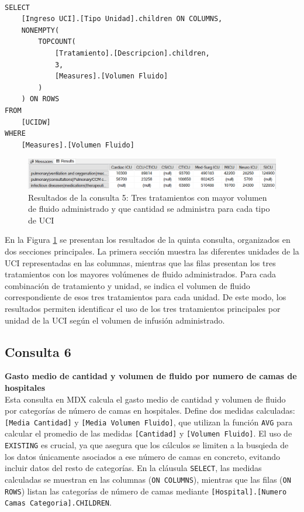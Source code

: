 \documentclass{article}
\begin{document}
\begin{lstlisting}[style=ddlstyle, label=lst:consulta5,caption=Consulta 5: Tres tratamientos con mayor volumen de fluido administrado y que cantidad se administra para cada tipo de UCI]
	
SELECT 
	[Ingreso UCI].[Tipo Unidad].children ON COLUMNS, 
	NONEMPTY(
		TOPCOUNT(
			[Tratamiento].[Descripcion].children, 
			3, 
			[Measures].[Volumen Fluido]
		)
	) ON ROWS
FROM 
	[UCIDW]
WHERE 
	[Measures].[Volumen Fluido]
\end{lstlisting}

\begin{figure}[H]
	\centering
	\includegraphics[width=0.9\linewidth]{images/consulta5.png}
	\caption{Resultados de la consulta 5: Tres tratamientos con mayor volumen de fluido administrado y que cantidad se administra para cada tipo de UCI}
	\label{fig:consulta5}
\end{figure}

En la Figura \ref{fig:consulta5} se presentan los resultados de la quinta consulta, organizados en dos secciones principales. La primera sección muestra las diferentes unidades de la UCI representadas en las columnas, mientras que las filas presentan los tres tratamientos con los mayores volúmenes de fluido administrados. Para cada combinación de tratamiento y unidad, se indica el volumen de fluido correspondiente de esos tres tratamientos para cada unidad. De este modo, los resultados permiten identificar el uso de los tres tratamientos principales por unidad de la UCI según el volumen de infusión administrado.


\subsection{Consulta 6}

\textbf{Gasto medio de cantidad y volumen de fluido por numero de camas de hospitales}
\\

Esta consulta en MDX calcula el gasto medio de cantidad y volumen de fluido por categorías de número de camas en hospitales. Define dos medidas calculadas: \texttt{[Media Cantidad]} y \texttt{[Media Volumen Fluido]}, que utilizan la función \texttt{AVG} para calcular el promedio de las medidas \texttt{[Cantidad]} y \texttt{[Volumen Fluido]}. El uso de \texttt{EXISTING} es crucial, ya que asegura que los cálculos se limiten a la busqieda de los datos únicamente asociados a ese número de camas en concreto, evitando incluir datos del resto de categorías. En la cláusula \texttt{SELECT}, las medidas calculadas se muestran en las columnas (\texttt{ON COLUMNS}), mientras que las filas (\texttt{ON ROWS}) listan las categorías de número de camas mediante \texttt{[Hospital].[Numero Camas Categoria].CHILDREN}.
\\
\end{document}
